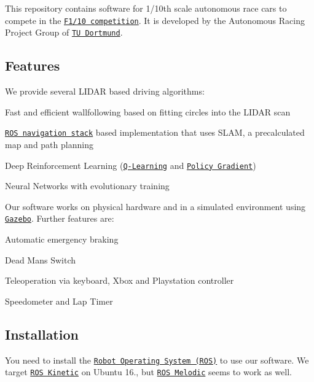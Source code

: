\href{https://travis-ci.com/Autonomous-Racing-PG/ar-tu-do}{\tt }

This repository contains software for 1/10th scale autonomous race cars to compete in the \href{http://f1tenth.org/}{\tt F1/10 competition}. It is developed by the Autonomous Racing Project Group of \href{https://ls12-www.cs.tu-dortmund.de/daes/}{\tt TU Dortmund}.



\subsection*{Features}

We provide several L\+I\+D\+AR based driving algorithms\+:


\begin{DoxyItemize}
\item Fast and efficient wallfollowing based on fitting circles into the L\+I\+D\+AR scan
\item \href{http://wiki.ros.org/navigation}{\tt R\+OS navigation stack} based implementation that uses S\+L\+AM, a precalculated map and path planning
\item Deep Reinforcement Learning (\href{https://en.wikipedia.org/wiki/Q-learning}{\tt Q-\/\+Learning} and \href{https://en.wikipedia.org/wiki/Reinforcement_learning#Direct_policy_search}{\tt Policy Gradient})
\item Neural Networks with evolutionary training
\end{DoxyItemize}

Our software works on physical hardware and in a simulated environment using \href{http://gazebosim.org/}{\tt Gazebo}. Further features are\+:


\begin{DoxyItemize}
\item Automatic emergency braking
\item Dead Man\textquotesingle{}s Switch
\item Teleoperation via keyboard, Xbox and Playstation controller
\item Speedometer and Lap Timer
\end{DoxyItemize}

\subsection*{Installation}

You need to install the \href{https://www.ros.org/}{\tt Robot Operating System (R\+OS)} to use our software. We target \href{http://wiki.ros.org/kinetic/Installation}{\tt R\+OS Kinetic} on Ubuntu 16., but \href{http://wiki.ros.org/melodic/Installation}{\tt R\+OS Melodic} seems to work as well.

